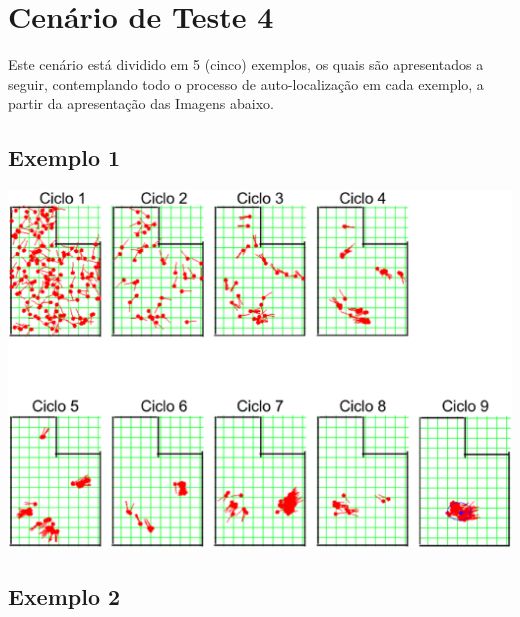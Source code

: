 \section{Cenário de Teste 4}

Este cenário está dividido em 5 (cinco) exemplos, os quais são apresentados a seguir, contemplando todo o processo de auto-localização
em cada exemplo, a partir da apresentação das Imagens abaixo.

\subsection{Exemplo 1}

{\centering
\includegraphics[scale=0.4]{figuras/cen4_ex1.eps}
\label{img:cen4_ex1}
\par}

\subsection{Exemplo 2}


